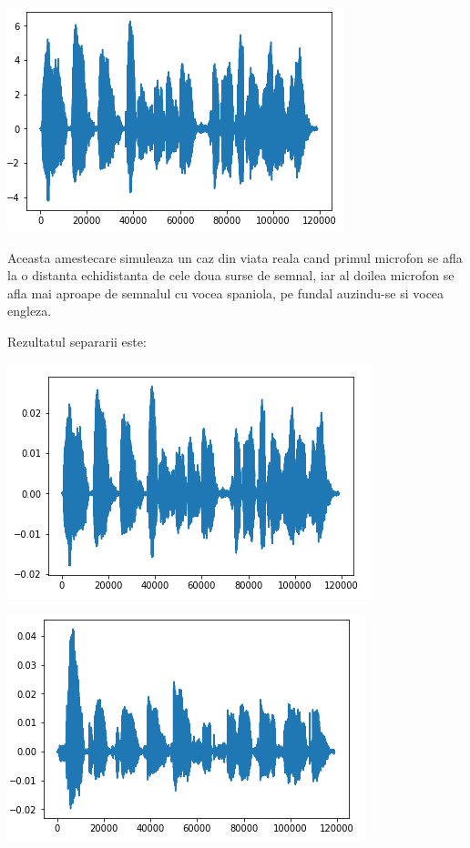 \documentclass[12pt,oneside]{article}
\begin{document}
\begin{center}
	\includegraphics[scale=1]{speech_mixed_2}
 \end{center}

 Aceasta amestecare simuleaza un caz din viata reala cand primul microfon se afla la o distanta echidistanta de cele doua surse de semnal, iar al doilea microfon se afla mai aproape de semnalul cu vocea spaniola, pe fundal auzindu-se si vocea engleza.

Rezultatul separarii este:
\begin{center}
	\includegraphics[scale=1]{speech_separated_1}
 \end{center}
\begin{center}
	\includegraphics[scale=1]{speech_separated_2}
 \end{center}
\end{document}
